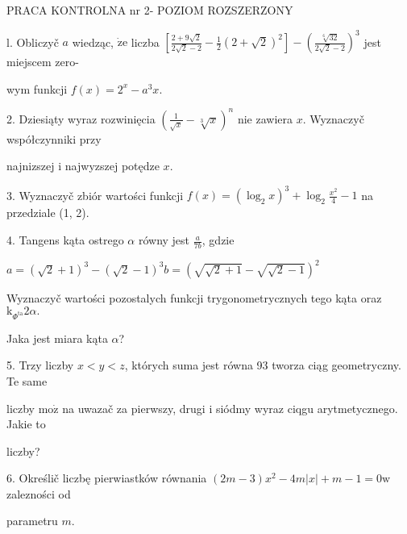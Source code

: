 \documentclass[a4paper,12pt]{article}
\begin{document}
PRACA KONTROLNA nr 2- POZIOM ROZSZERZONY

l. Obliczyč $a$ wiedząc, $\dot{\mathrm{z}}\mathrm{e}$ liczba $[\displaystyle \frac{2+9\sqrt{2}}{2\sqrt{2}-2}-\frac{1}{2}(2+\sqrt{2})^{2}]-(\frac{\sqrt[6]{32}}{2\sqrt{2}-2})^{3}$ jest miejscem zero-

wym funkcji $f(x)=2^{x}-a^{3}x.$

2. Dziesiąty wyraz rozwinięcia $(\displaystyle \frac{1}{\sqrt{x}}-\sqrt[3]{x})^{n}$ nie zawiera $x$. Wyznaczyč współczynniki przy

najnizszej $\mathrm{i}$ najwyzszej potędze $x.$

3. Wyznaczyč zbiór wartości funkcji $f(x)=(\displaystyle \log_{2}x)^{3}+\log_{2}\frac{x^{2}}{4}-1$ na przedziale (1, 2).

4. Tangens kąta ostrego $\alpha$ równy jest $\displaystyle \frac{a}{7b}$, gdzie

$a=(\sqrt{2}+1)^{3}-(\sqrt{2}-1)^{3}b=(\sqrt{\sqrt{2}+1}-\sqrt{\sqrt{2}-1})^{2}$

Wyznaczyč wartości pozostalych funkcji trygonometrycznych tego kąta oraz $\mathrm{k}_{\Phi^{\mathrm{t}\mathrm{a}}}2\alpha.$

Jaka jest miara kąta $\alpha$?

5. Trzy liczby $x<y<z$, których suma jest równa 93 tworza ciąg geometryczny. Te same

liczby $\mathrm{m}\mathrm{o}\dot{\mathrm{z}}$ na uwazač za pierwszy, drugi $\mathrm{i}$ siódmy wyraz ciqgu arytmetycznego. Jakie to

liczby?

6. Określič liczbę pierwiastków równania $(2m-3)x^{2}-4m|x|+m-1=0\mathrm{w}$ zalezności od

parametru $m.$
\end{document}
